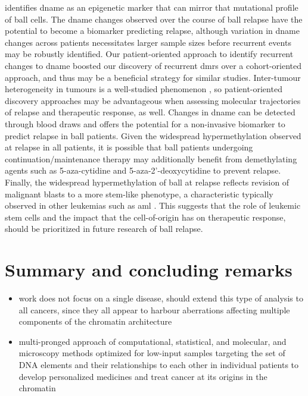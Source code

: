  identifies \gls{dname} as an epigenetic marker that can mirror that mutational profile of \gls{ball} cells.
The \gls{dname} changes observed over the course of \gls{ball} relapse have the potential to become a biomarker predicting relapse, although variation in \gls{dname} changes across patients necessitates larger sample sizes before recurrent events may be robustly identified.
Our patient-oriented approach to identify recurrent changes to \gls{dname} boosted our discovery of recurrent \glspl{dmr} over a cohort-oriented approach, and thus may be a beneficial strategy for similar studies.
Inter-tumour heterogeneity in tumours is a well-studied phenomenon \cite{marusykTumorHeterogeneityCauses2010,sottorivaCatchMyDrift2017,huangGeneticNongeneticInstability2013,mcgranahanBiologicalTherapeuticImpact2015,landauChronicLymphocyticLeukemia2013,ben-davidGeneticTranscriptionalEvolution2018,carterEpigeneticBasisCellular2021}, so patient-oriented discovery approaches may be advantageous when assessing molecular trajectories of relapse and therapeutic response, as well.
Changes in \gls{dname} can be detected through blood draws \cite{peterDynamicsCellfreeDNA2020,shenSensitiveTumourDetection2018,nassiriDetectionDiscriminationIntracranial2020} and offers the potential for a non-invasive biomarker to predict relapse in \gls{ball} patients.
Given the widespread hypermethylation observed at relapse in all patients, it is possible that \gls{ball} patients undergoing continuation/maintenance therapy may additionally benefit from demethylating agents such as 5-aza-cytidine and 5-aza-2'-deoxycytidine to prevent relapse.
Finally, the widespread hypermethylation of \gls{ball} at relapse reflects revision of malignant blasts to a more stem-like phenotype, a characteristic typically observed in other leukemias such as \gls{aml} \cite{krivtsovMLLTranslocationsHistone2007,liClinicalImplicationsGenomewide2017,kresoEvolutionCancerStem2014,shlushIdentificationPreleukaemicHaematopoietic2014,shlushTracingOriginsRelapse2017}.
This suggests that the role of leukemic stem cells and the impact that the cell-of-origin has on therapeutic response, should be prioritized in future research of \gls{ball} relapse.

\section{Summary and concluding remarks}

\begin{itemize}
  \item work does not focus on a single disease, should extend this type of analysis to all cancers, since they all appear to harbour aberrations affecting multiple components of the chromatin architecture
  \item multi-pronged approach of computational, statistical, and molecular, and microscopy methods optimized for low-input samples targeting the set of DNA elements and their relationships to each other in individual patients to develop personalized medicines and treat cancer at its origins in the chromatin
\end{itemize}
